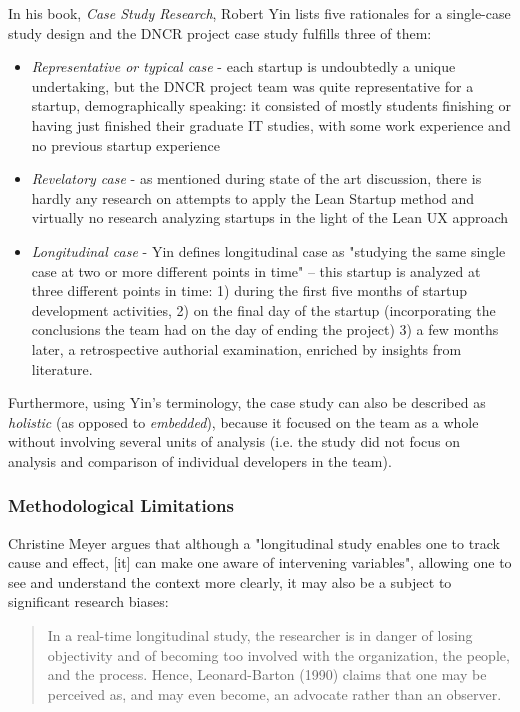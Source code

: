 \documentclass{article}
\begin{document}
In his book, \textit{Case Study Research}\cite{yin2013case}, Robert Yin lists five rationales for a single-case study design and the DNCR project case study fulfills three of them:
\begin{itemize}
\item \textit{Representative or typical case} - each startup is undoubtedly a unique undertaking, but the DNCR project team was quite representative for a startup, demographically speaking: it consisted of mostly students finishing or having just finished their graduate IT studies, with some work experience and no previous startup experience
\item \textit{Revelatory case} - as mentioned during state of the art discussion, there is hardly any research on attempts to apply the Lean Startup method and virtually no research analyzing startups in the light of the Lean UX approach
\item \textit{Longitudinal case} - Yin defines longitudinal case as "studying the same single case at two or more different points in time" – this startup is analyzed at three different points in time: 1) during the first five months of startup development activities, 2) on the final day of the startup (incorporating the conclusions the team had on the day of ending the project) 3) a few months later, a retrospective authorial examination, enriched by insights from literature.
\end{itemize}

Furthermore, using Yin's terminology, the case study can also be described as \textit{holistic} (as opposed to \textit{embedded}), because it focused on the team as a whole without involving several units of analysis (i.e. the study did not focus on analysis and comparison of individual developers in the team).

\subsubsection{Methodological Limitations}
Christine Meyer \cite{meyer2001case} argues that although a "longitudinal study enables one to track cause and effect, [it] can make one aware of intervening variables", allowing one to see and understand the context more clearly, it may also be a subject to significant research biases:
\begin{quote}
In a real-time longitudinal study, the researcher is in danger of losing objectivity and of becoming too involved with the organization, the people, and the process. Hence, Leonard-Barton (1990) claims that one may be perceived as, and may even become, an advocate rather than an observer.
\end{quote}
\end{document}
